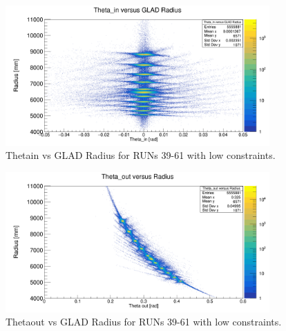 \documentclass[12pt, letterpaper]{article}
\begin{document}
\begin{appendices}
\begin{figure}[!htb]
	\centering
	\includegraphics[width=0.9\textwidth]{theta_in_rad_low_constr.png}
	\caption{Theta\textunderscore in vs GLAD Radius for RUNs 39-61 with low constraints.}
	\label{fig:theta_in_rad_low_const}
\end{figure}

\begin{figure}[!htb]
	\centering
	\includegraphics[width=0.9\textwidth]{theta_out_vs_rad_low_constr.png}
	\caption{Theta\textunderscore out vs GLAD Radius for RUNs 39-61 with low constraints.}
	\label{fig:theta_out_rad_low_const}
\end{figure}
\end{appendices}
\end{document}
